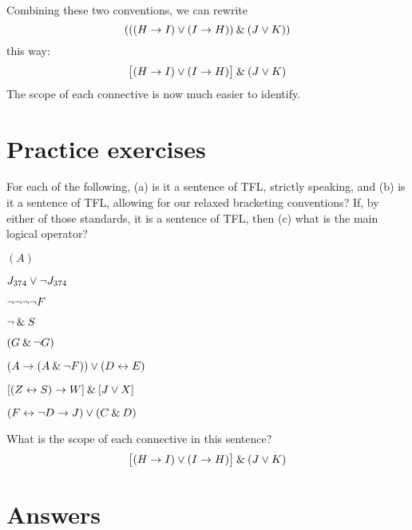Combining these two conventions, we can rewrite 
$$(((H \rightarrow I) \vee (I \rightarrow H)) \mathbin{\&} (J \vee K))$$
this way:
$$\bigl[(H \rightarrow I) \vee (I \rightarrow H)\bigr] \mathbin{\&} (J \vee K)$$
The scope of each connective is now much easier to identify.





\section{Practice exercises}
\setcounter{ProbPart}{0}

\problempart
\label{pr.wiffTFL}
For each of the following, (a) is it a sentence of TFL, strictly speaking, and (b) is it a sentence of TFL, allowing for our relaxed bracketing conventions? If, by either of those standards, it is a sentence of TFL, then (c) what is the main logical operator?
\begin{earg}
\item $(A)$
\item $J_{374} \vee {\neg} J_{374}$
\item ${\neg} {\neg} {\neg} {\neg} F$
\item ${\neg} \mathbin{\&} S$
\item $(G \mathbin{\&} {\neg} G)$
\item $(A \rightarrow (A \mathbin{\&} {\neg} F)) \vee (D \leftrightarrow E)$
\item $[(Z \leftrightarrow S) \rightarrow W] \mathbin{\&} [J \vee X]$
\item $(F \leftrightarrow {\neg} D \rightarrow J) \vee (C \mathbin{\&} D)$
\end{earg}


\problempart
What is the scope of each connective in this sentence?
$$\bigl[(H \rightarrow I) \vee (I \rightarrow H)\bigr] \mathbin{\&} (J \vee K)$$



\section{Answers}
\setcounter{ProbPart}{0}

